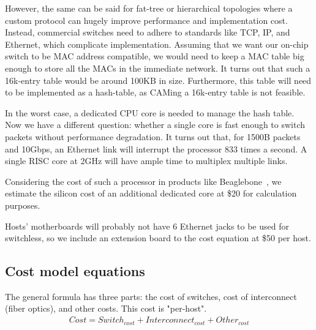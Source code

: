 However, the same can be said for fat-tree or hierarchical topologies where a custom protocol can hugely improve performance and implementation cost. Instead, commercial switches need to adhere to standards like TCP, IP, and Ethernet, which complicate implementation. Assuming that we want our on-chip switch to be MAC address compatible, we would need to keep a MAC table big enough to store all the MACs in the immediate network. It turns out that such a 16k-entry table would be around 100KB in size. Furthermore, this table will need to be implemented as a hash-table, as CAMing a 16k-entry table is not feasible.

In the worst case, a dedicated CPU core is needed to manage the hash table. Now we have a different question: whether a single core is fast enough to switch packets without performance degradation. It turns out that, for 1500B packets and 10Gbps, an Ethernet link will interrupt the processor 833 times a second. A single RISC core at 2GHz will have ample time to multiplex multiple links.

Considering the cost of such a processor in products like Beaglebone~\cite{FIXME}, we estimate the silicon cost of an additional dedicated core at \$20 for calculation purposes.

Hosts' motherboards will probably not have 6 Ethernet jacks to be used for switchless, so we include an extension board to the cost equation at \$50 per host.
\vspace{-0.1in}
\subsection{Cost model equations}
The general formula has three parts: the cost of switches, cost of interconnect (fiber optics), and other costs. This cost is "per-host".
\vspace{-0.1in}
\begin{multline}
Cost = Switch_{cost} + Interconnect_{cost} + Other_{cost}
\end{multline}
